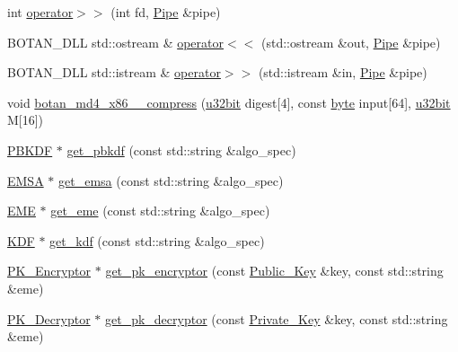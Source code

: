 \begin{DoxyCompactItemize}
\item 
int \hyperlink{namespaceBotan_a1a25e74acee49eeec8508b70a6b79109}{operator$>$$>$} (int fd, \hyperlink{classBotan_1_1Pipe}{Pipe} \&pipe)
\item 
B\-O\-T\-A\-N\-\_\-\-D\-L\-L std\-::ostream \& \hyperlink{namespaceBotan_a17432f5e31acac0d002c039c7ecf6bb4}{operator$<$$<$} (std\-::ostream \&out, \hyperlink{classBotan_1_1Pipe}{Pipe} \&pipe)
\item 
B\-O\-T\-A\-N\-\_\-\-D\-L\-L std\-::istream \& \hyperlink{namespaceBotan_acdc9f284a06017324c71df9f66c32a23}{operator$>$$>$} (std\-::istream \&in, \hyperlink{classBotan_1_1Pipe}{Pipe} \&pipe)
\item 
void \hyperlink{namespaceBotan_a1777c71c19e5ddc6f578345df02a703d}{botan\-\_\-md4\-\_\-x86\-\_\-\_\-compress} (\hyperlink{namespaceBotan_aacc7d03c95e97e76168fc1c819031830}{u32bit} digest\mbox{[}4\mbox{]}, const \hyperlink{namespaceBotan_a7d793989d801281df48c6b19616b8b84}{byte} input\mbox{[}64\mbox{]}, \hyperlink{namespaceBotan_aacc7d03c95e97e76168fc1c819031830}{u32bit} M\mbox{[}16\mbox{]})
\item 
\hyperlink{classBotan_1_1PBKDF}{P\-B\-K\-D\-F} $\ast$ \hyperlink{namespaceBotan_aff3f24dde647603d5c06d80dc11fcacb}{get\-\_\-pbkdf} (const std\-::string \&algo\-\_\-spec)
\item 
\hyperlink{classBotan_1_1EMSA}{E\-M\-S\-A} $\ast$ \hyperlink{namespaceBotan_a52d71f0fdd487f33ad204c2fb17b4247}{get\-\_\-emsa} (const std\-::string \&algo\-\_\-spec)
\item 
\hyperlink{classBotan_1_1EME}{E\-M\-E} $\ast$ \hyperlink{namespaceBotan_ae9b228b4ec8c21a6a4a2db4c52661d24}{get\-\_\-eme} (const std\-::string \&algo\-\_\-spec)
\item 
\hyperlink{classBotan_1_1KDF}{K\-D\-F} $\ast$ \hyperlink{namespaceBotan_a48dc14d8432baf2bf02753e8417d2f7e}{get\-\_\-kdf} (const std\-::string \&algo\-\_\-spec)
\item 
\hyperlink{classBotan_1_1PK__Encryptor}{P\-K\-\_\-\-Encryptor} $\ast$ \hyperlink{namespaceBotan_aa5012e9738c4812696d869b5fee2b191}{get\-\_\-pk\-\_\-encryptor} (const \hyperlink{classBotan_1_1Public__Key}{Public\-\_\-\-Key} \&key, const std\-::string \&eme)
\item 
\hyperlink{classBotan_1_1PK__Decryptor}{P\-K\-\_\-\-Decryptor} $\ast$ \hyperlink{namespaceBotan_a6968cb00906c60ad02915e8c432ae1a6}{get\-\_\-pk\-\_\-decryptor} (const \hyperlink{classBotan_1_1Private__Key}{Private\-\_\-\-Key} \&key, const std\-::string \&eme)
\item 

\end{DoxyCompactItemize}
